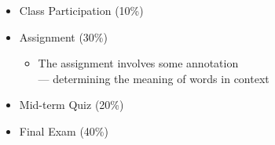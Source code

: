 \documentclass[headrule,footrule]{foils}
\begin{document}
\begin{itemize}
\item Class Participation (10\%)
\item Assignment (30\%)
  \begin{itemize}
  \item The assignment involves some annotation 
    \\ --- determining the meaning of words in context
  \end{itemize}
\item Mid-term Quiz (20\%)
\item Final Exam (40\%)
\end{itemize}
\end{document}
